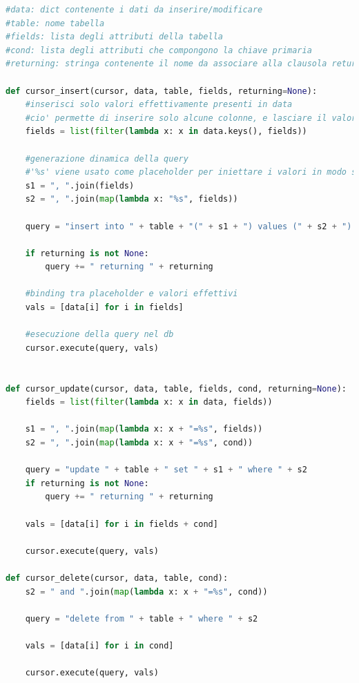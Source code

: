 \documentclass[12pt,a4paper,twoside,english,italian]{book}
\begin{document}
\begin{lstlisting}[language=python, caption=Funzioni \emph{cursor\_*}]
#data: dict contenente i dati da inserire/modificare
#table: nome tabella
#fields: lista degli attributi della tabella
#cond: lista degli attributi che compongono la chiave primaria
#returning: stringa contenente il nome da associare alla clausola returning (per la generazione di valori da parte del database)

def cursor_insert(cursor, data, table, fields, returning=None):
    #inserisci solo valori effettivamente presenti in data
    #cio' permette di inserire solo alcune colonne, e lasciare il valore di default nelle rimanenti
    fields = list(filter(lambda x: x in data.keys(), fields))

    #generazione dinamica della query
    #'%s' viene usato come placeholder per iniettare i valori in modo safe (contro attacchi di tipo sql injection)
    s1 = ", ".join(fields)
    s2 = ", ".join(map(lambda x: "%s", fields))

    query = "insert into " + table + "(" + s1 + ") values (" + s2 + ") "

    if returning is not None:
        query += " returning " + returning

    #binding tra placeholder e valori effettivi
    vals = [data[i] for i in fields]

    #esecuzione della query nel db
    cursor.execute(query, vals)


def cursor_update(cursor, data, table, fields, cond, returning=None):
    fields = list(filter(lambda x: x in data, fields))

    s1 = ", ".join(map(lambda x: x + "=%s", fields))
    s2 = ", ".join(map(lambda x: x + "=%s", cond))

    query = "update " + table + " set " + s1 + " where " + s2
    if returning is not None:
        query += " returning " + returning

    vals = [data[i] for i in fields + cond]

    cursor.execute(query, vals)

def cursor_delete(cursor, data, table, cond):
    s2 = " and ".join(map(lambda x: x + "=%s", cond))

    query = "delete from " + table + " where " + s2

    vals = [data[i] for i in cond]

    cursor.execute(query, vals)
\end{lstlisting}
\end{document}
